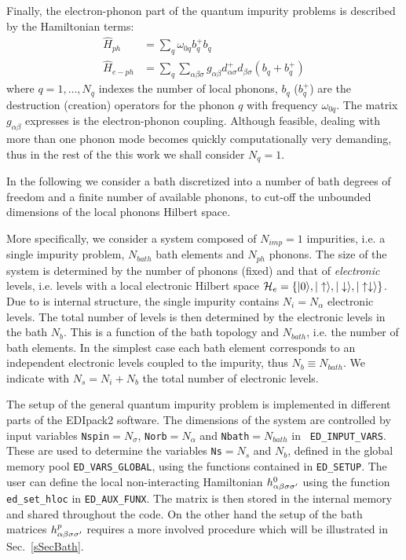 \documentclass[final,3p,10pt]{elsarticle}
\newcommand{\secu}[1]
{Sec.~\ref{#1}}
\newcommand{\ket}[1]
{|#1\rangle}
\def\a{\alpha}       \def\b{\beta}   \def\g{\gamma}   \def\d{\delta}
\def\up{\uparrow} \def\down{\downarrow} \def\dw{\downarrow}
\def\NAME{{\rm EDIpack2 }}
\begin{document}
Finally, the electron-phonon part of the quantum impurity problems is
described by the Hamiltonian terms: 
\begin{equation}\label{Hph}
  \begin{split}
    \hat{H}_{ph}&=\sum_q \omega_{0q} b_q^+b_q\\
    \hat{H}_{e-ph} &= \sum_q\sum_{\a\b\sigma} g_{\a\b} d^+_{\a\sigma}d_{\b\sigma}(b_q+b_q^+)
\end{split}
\end{equation}
where $q=1,\dots,N_q$ indexes the number of local phonons, $b_q$
($b_q^+$) are the destruction (creation) operators for the phonon $q$
with frequency $\omega_{0q}$. The matrix  $g_{\a\b}$ expresses is the electron-phonon coupling. 
Although feasible, dealing with more than one phonon mode becomes
quickly computationally very demanding, thus in the rest of the this
work we shall consider $N_q=1$. 


In the following we consider a bath discretized into a  number
of bath degrees of freedom and a finite number of available phonons,
to cut-off the unbounded dimensions of the local phonons Hilbert space.


More specifically, we consider a system composed of $N_{imp}=1$
impurities, i.e. a single impurity problem, $N_{bath}$ bath elements
and $N_{ph}$ phonons. The size of the system is determined by
the number of phonons (fixed) and that of {\it electronic} levels, i.e. levels with a local
electronic Hilbert space
$\HH_e=\{\ket{0},\ket{\up},\ket{\dw},\ket{\up\dw} \}$. 
Due to is internal structure, the single impurity contains
$N_i= N_\a$ electronic levels.
The total number of levels is then determined by
the electronic levels in the bath $N_b$. This is a function of the bath topology and $N_{bath}$,
i.e. the number of bath elements. In the simplest case each bath
element corresponds to an independent electronic levels coupled to the
impurity, thus $N_b\equiv N_{bath}$. 
We indicate with $N_s=N_i + N_b$ the total number of electronic levels. 

The setup of the general quantum impurity problem is implemented in
different parts of the \NAME software. The dimensions of the system
are controlled by input variables {\tt Nspin}$=N_\sigma$,
{\tt Norb}$=N_\a$ and {\tt Nbath}$=N_{bath}$ in {\tt
  ED\_INPUT\_VARS}. These are used to
determine the variables {\tt Ns}$=N_s$ and $N_b$, defined in the global
memory pool {\tt ED\_VARS\_GLOBAL}, using the functions contained
in {\tt ED\_SETUP}. 
The user can define the local non-interacting Hamiltonian
$h^0_{\a\b\s\s'}$ using the function {\tt ed\_set\_hloc} in {\tt ED\_AUX\_FUNX}.
The matrix is then stored in the internal memory and shared throughout the
code.
On the other hand the setup of the bath matrices $h^p_{\a\b\s\s'}$
requires a more involved procedure which will be illustrated in
\secu{sSecBath}. 
\end{document}
